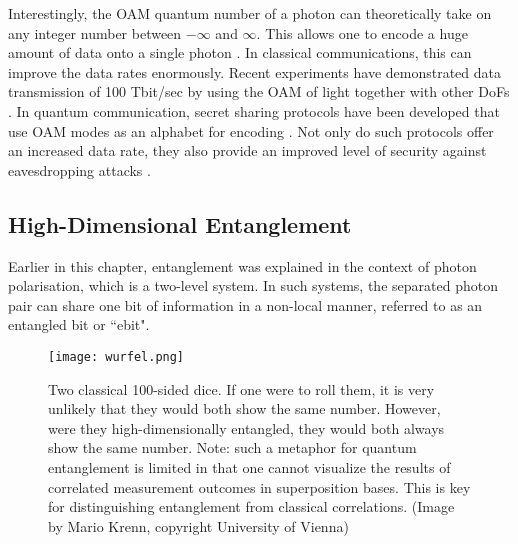 \documentclass{article}
\begin{document}
Interestingly, the OAM quantum number of a photon can theoretically take on any integer number between $-\infty$ and $\infty$. This allows one to encode a huge amount of data onto a single photon \cite{vcelechovsky2007optical,Gibson:2004fw}. In classical communications, this can improve the data rates enormously. Recent experiments have demonstrated data transmission of 100 Tbit/sec by using the OAM of light together with other DoFs \cite{Wang:2012ha,huang2013100}. In quantum communication, secret sharing protocols have been developed that use OAM modes as an alphabet for encoding \cite{Groeblacher:2005ec,MolinaTerriza:2005tr,Walborn:2006jv,Mafu:2013jk,Mirhosseini:2015fy}. Not only do such protocols offer an increased data rate, they also provide an improved level of security against eavesdropping attacks \cite{Wang:2005gk,huber2013weak}.

\subsection{High-Dimensional Entanglement}
Earlier in this chapter, entanglement was explained in the context of photon polarisation, which is a two-level system. In such systems, the separated photon pair can share one bit of information in a non-local manner, referred to as an entangled bit or ``ebit".

\begin{figure}[h!]
\centering
\texttt{[image: wurfel.png]}
\caption{Two classical 100-sided dice. If one were to roll them, it is very unlikely that they would both show the same number. However, were they high-dimensionally entangled, they would both always show the same number. Note: such a metaphor for quantum entanglement is limited in that one cannot visualize the results of correlated measurement outcomes in superposition bases. This is key for distinguishing entanglement from classical correlations. (Image by Mario Krenn, copyright University of Vienna)}
\label{fig:100die}
\end{figure}
\end{document}
